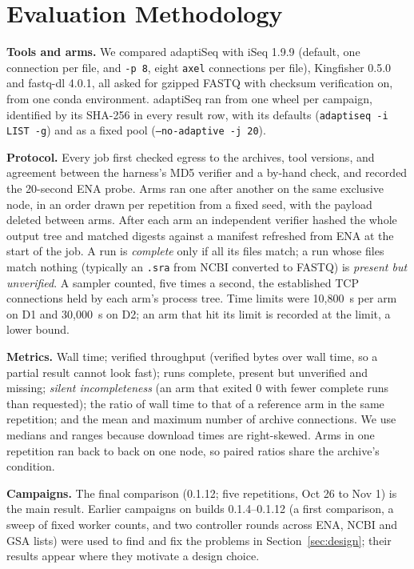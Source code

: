 \documentclass[conference]{IEEEtran}
\begin{document}
\section{Evaluation Methodology}\label{sec:method}
\textbf{Tools and arms.} We compared adaptiSeq with iSeq 1.9.9 (default, one connection per file, and \texttt{-p 8}, eight \texttt{axel} connections per file), Kingfisher 0.5.0 and fastq-dl 4.0.1, all asked for gzipped FASTQ with checksum verification on, from one conda environment. adaptiSeq ran from one wheel per campaign, identified by its SHA-256 in every result row, with its defaults (\texttt{adaptiseq -i LIST -g}) and as a fixed pool (\texttt{--no-adaptive -j 20}).

\textbf{Protocol.} Every job first checked egress to the archives, tool versions, and agreement between the harness's MD5 verifier and a by-hand check, and recorded the 20-second ENA probe. Arms ran one after another on the same exclusive node, in an order drawn per repetition from a fixed seed, with the payload deleted between arms. After each arm an independent verifier hashed the whole output tree and matched digests against a manifest refreshed from ENA at the start of the job. A run is \emph{complete} only if all its files match; a run whose files match nothing (typically an \texttt{.sra} from NCBI converted to FASTQ) is \emph{present but unverified}. A sampler counted, five times a second, the established TCP connections held by each arm's process tree. Time limits were 10,800~s per arm on D1 and 30,000~s on D2; an arm that hit its limit is recorded at the limit, a lower bound.

\textbf{Metrics.} Wall time; verified throughput (verified bytes over wall time, so a partial result cannot look fast); runs complete, present but unverified and missing; \emph{silent incompleteness} (an arm that exited 0 with fewer complete runs than requested); the ratio of wall time to that of a reference arm in the same repetition; and the mean and maximum number of archive connections. We use medians and ranges because download times are right-skewed. Arms in one repetition ran back to back on one node, so paired ratios share the archive's condition.

\textbf{Campaigns.} The final comparison (0.1.12; five repetitions, Oct 26 to Nov 1) is the main result. Earlier campaigns on builds 0.1.4--0.1.12 (a first comparison, a sweep of fixed worker counts, and two controller rounds across ENA, NCBI and GSA lists) were used to find and fix the problems in Section~\ref{sec:design}; their results appear where they motivate a design choice.
\end{document}

